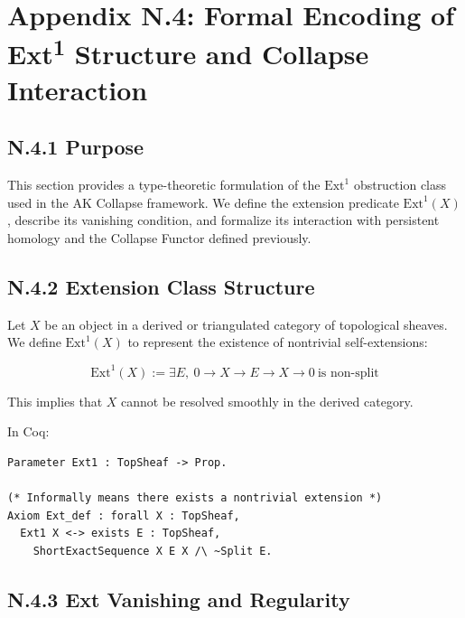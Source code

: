 \documentclass[11pt]{article}
\begin{document}

\section*{Appendix N.4: Formal Encoding of Ext\textsuperscript{1} Structure and Collapse Interaction}

\subsection*{N.4.1 Purpose}

This section provides a type-theoretic formulation of the $\mathrm{Ext}^1$ obstruction class used in the AK Collapse framework.  
We define the extension predicate $\mathrm{Ext}^1(X)$, describe its vanishing condition, and formalize its interaction with  
persistent homology and the Collapse Functor defined previously.

\subsection*{N.4.2 Extension Class Structure}

Let $X$ be an object in a derived or triangulated category of topological sheaves.  
We define $\mathrm{Ext}^1(X)$ to represent the existence of nontrivial self-extensions:

\[
\mathrm{Ext}^1(X) := \exists E,\ 0 \rightarrow X \rightarrow E \rightarrow X \rightarrow 0\ \text{is non-split}
\]

This implies that $X$ cannot be resolved smoothly in the derived category.

In Coq:

\begin{verbatim}
Parameter Ext1 : TopSheaf -> Prop.

(* Informally means there exists a nontrivial extension *)
Axiom Ext_def : forall X : TopSheaf,
  Ext1 X <-> exists E : TopSheaf,
    ShortExactSequence X E X /\ ~Split E.
\end{verbatim}

\subsection*{N.4.3 Ext Vanishing and Regularity}
\end{document}
